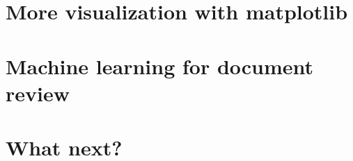 \documentclass{book}
\begin{document}
\chapter{More visualization with matplotlib}
\chapter{Machine learning for document review}
\chapter{What next?}
\end{document}
